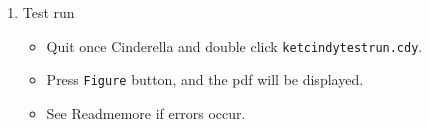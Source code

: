\documentclass{article}
\begin{document}
\begin{enumerate}[\bf\large 1.]
\vspace{75mm}

\item Test run
\begin{itemize}
\item Quit once Cinderella and double click \verb|ketcindytestrun.cdy|.
\item Press \verb|Figure| button, and the pdf will be displayed.
\item See Readmemore if errors occur.
\end{itemize}


  \end{enumerate}
\end{document}

